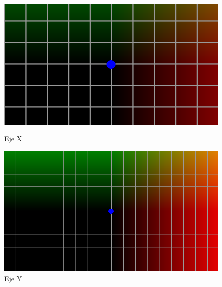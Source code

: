 \begin{figure}[htbp]
    \centering
    \begin{minipage}[b]{0.45\textwidth}
        \centering
        \includegraphics[width=\textwidth]{Plantilla-TFG-master/img/normXColor.png}
        \caption{Eje X}
    \end{minipage}
    \hfill
    \begin{minipage}[b]{0.45\textwidth}
        \centering
        \includegraphics[width=\textwidth]{Plantilla-TFG-master/img/normYColor.png}
        \caption{Eje Y}
    \end{minipage}
    
    \medskip
    

\end{figure}
